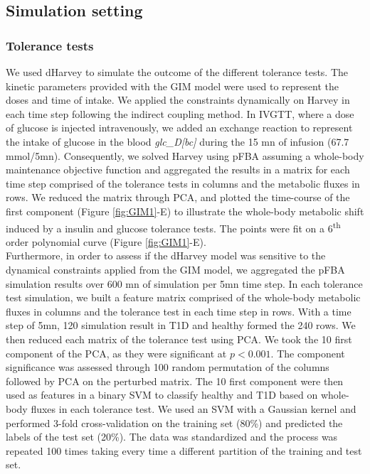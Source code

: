\subsection{Simulation setting} \label{GIM:spsim}
\subsubsection{Tolerance tests}
We used dHarvey to simulate the outcome of the different tolerance tests.
The kinetic parameters provided with the GIM model were used to represent the doses and time of intake. We applied the constraints dynamically on Harvey in each time step following the indirect coupling method. In IVGTT, where a dose of glucose is injected intravenously, we added an exchange reaction to represent the intake of glucose in the blood \textit{glc\_D[bc]} during the 15 mn of infusion (67.7 mmol/5mn). Consequently, we solved Harvey using pFBA \cite{lewis2010omic} assuming a whole-body maintenance objective function and aggregated the results in a matrix for each time step comprised of the tolerance tests in columns and the metabolic fluxes in rows. We reduced the matrix through PCA, and plotted the time-course of the first component (Figure \ref{fig:GIM1}-E) to illustrate the whole-body metabolic shift induced by a insulin and glucose tolerance tests. The points were fit on a 6\textsuperscript{th} order polynomial curve (Figure \ref{fig:GIM1}-E).\\
Furthermore, in order to assess if the dHarvey model was sensitive to the dynamical constraints applied from the GIM model, we aggregated the pFBA simulation results over 600 mn of simulation per 5mn time step. In each tolerance test simulation, we built a feature matrix comprised of the whole-body metabolic fluxes  in columns and the tolerance test in each time step in rows. With a time step of 5mn, 120 simulation result in T1D and healthy formed the 240 rows. We then reduced each matrix of the tolerance test using PCA. We took the 10 first component of the PCA, as they were significant at $p<0.001$. The component significance was assessed through 100 random permutation of the columns followed by PCA on the perturbed matrix. The 10 first component were then used as features in a binary SVM to classify healthy and T1D based on whole-body fluxes in each tolerance test. We used an SVM with a Gaussian kernel and performed 3-fold cross-validation on the training set (80\%) and predicted the labels of the test set (20\%). The data was standardized and the process was repeated 100 times taking every time a different partition of the training and test set.
